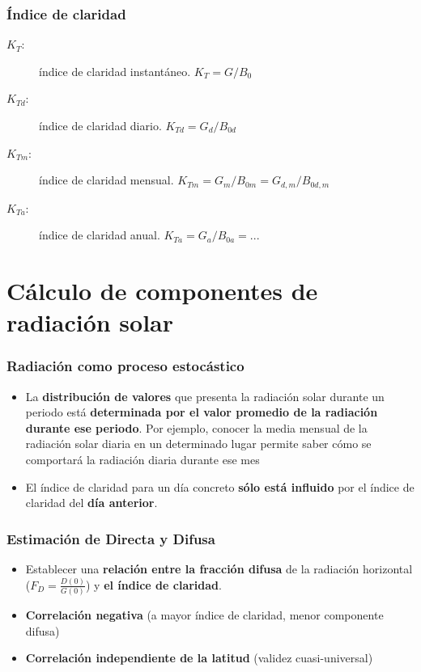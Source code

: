 \documentclass[serif, xcolor=dvipsnames]{beamer}
\begin{document}
\begin{frame}
\frametitle{Índice de claridad}
\begin{description}
\item [{$K_{T}$:}] índice de claridad instantáneo. $K_{T}=G/B_{0}$
\item [{$K_{Td}$:}] índice de claridad diario. $K_{Td}=G_{d}/B_{0d}$
\item [{$K_{Tm}$:}] índice de claridad mensual. $K_{Tm}=G_{m}/B_{0m}=G_{d,m}/B_{0d,m}$
\item [{$K_{Ta}$:}] índice de claridad anual. $K_{Ta}=G_{a}/B_{0a}=...$
\end{description}

\end{frame}
\section{Cálculo de componentes de radiación solar}


\begin{frame}
\frametitle{Radiación como proceso estocástico}
\begin{itemize}
\item La \textbf{distribución de valores} que presenta la radiación solar
durante un periodo está \textbf{determinada por el valor promedio
de la radiación durante ese periodo}. Por ejemplo, conocer la media
mensual de la radiación solar diaria en un determinado lugar permite
saber cómo se comportará la radiación diaria durante ese mes 
\item El índice de claridad para un día concreto \textbf{sólo está influido}
por el índice de claridad del \textbf{día anterior}. 
\end{itemize}

\end{frame}
\begin{frame}
\frametitle{Estimación de Directa y Difusa}
\begin{itemize}
\item Establecer una \textbf{relación entre la fracción difusa} de la radiación
horizontal ($F_{D}=\frac{D(0)}{G(0)}$) y \textbf{el índice de claridad}.
\item \textbf{Correlación negativa} (a mayor índice de claridad, menor componente
difusa)
\item \textbf{Correlación independiente de la latitud} (validez cuasi-universal)
\end{itemize}

\end{frame}
\end{document}
